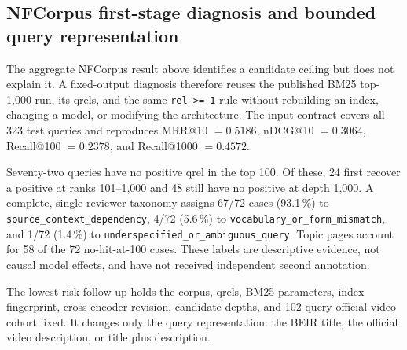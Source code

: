 \documentclass[11pt,a4paper]{article}
\makeatletter
\newcommand{\mrr}{MRR@10}
\newcommand{\ndcg}{nDCG@10}
\newcommand{\recallH}{Recall@100}
\newcommand{\recallK}{Recall@1000}
\newcommand{\bmtwofive}{BM25}
\makeatother
\begin{document}
\subsection{NFCorpus first-stage diagnosis and bounded query representation}
\label{sec:nfcorpus-first-stage}

The aggregate NFCorpus result above identifies a candidate ceiling but
does not explain it.  A fixed-output diagnosis therefore reuses the
published \bmtwofive{} top-1,000 run, its qrels, and the same
\texttt{rel >= 1} rule without rebuilding an index, changing a model,
or modifying the architecture.  The input contract covers all 323 test
queries and reproduces \mrr{} $=0.5186$, \ndcg{} $=0.3064$,
\recallH{} $=0.2378$, and \recallK{} $=0.4572$.

Seventy-two queries have no positive qrel in the top 100.  Of these,
24 first recover a positive at ranks 101--1,000 and 48 still have no
positive at depth 1,000.  A complete, single-reviewer taxonomy assigns
67/72 cases (93.1\,\%) to \texttt{source\_context\_dependency}, 4/72
(5.6\,\%) to \texttt{vocabulary\_or\_form\_mismatch}, and 1/72
(1.4\,\%) to \texttt{underspecified\_or\_ambiguous\_query}.  Topic
pages account for 58 of the 72 no-hit-at-100 cases.  These labels are
descriptive evidence, not causal model effects, and have not received
independent second annotation.

The lowest-risk follow-up holds the corpus, qrels, \bmtwofive{}
parameters, index fingerprint, cross-encoder revision, candidate
depths, and 102-query official video cohort fixed.  It changes only the
query representation: the BEIR title, the official video description,
or title plus description.

\begin{table}[H]
  \centering\small
  \caption{First-stage \bmtwofive{} results on the fixed 102-query
  NFCorpus video subset.  Each condition retrieves to depth 1,000.}
  \label{tab:nfcorpus-video-bm25}
  
\end{table}

\begin{table}[H]
  \centering\small
  \caption{The same three query representations after the frozen
  cross-encoder reorders each condition's \bmtwofive{} top 100.
  Recall@100 is unchanged within a condition by construction.}
  \label{tab:nfcorpus-video-ce}
  
\end{table}
\end{document}
